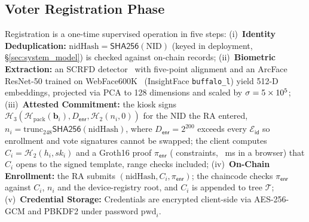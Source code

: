 \documentclass[10pt,letterpaper,journal]{IEEEtran}
\begin{document}
\subsection{Voter Registration Phase}
Registration is a one-time supervised operation in five steps:
(i)~\textbf{Identity Deduplication:} $\text{nidHash} = \mathsf{SHA256}(\text{NID})$ (keyed in deployment, \S\ref{sec:system_model}) is checked against on-chain records;
(ii)~\textbf{Biometric Extraction:} an SCRFD detector~\cite{Guo2022SCRFD} with five-point alignment and an ArcFace ResNet-50 trained on WebFace600K~\cite{Zhu2021WebFace260M} (InsightFace \texttt{buffalo\_l}) yield 512-D embeddings, projected via PCA to 128 dimensions and scaled by $\sigma = 5 \times 10^{5}$;
(iii)~\textbf{Attested Commitment:} the kiosk signs $\mathcal{H}_3(\mathcal{H}_{\text{pack}}(\mathbf{b}_i), D_{\mathsf{enr}}, \mathcal{H}_2(n_i, 0))$ for the NID the RA entered, $n_i = \mathrm{trunc}_{248}\mathsf{SHA256}(\text{nidHash})$, where $D_{\mathsf{enr}} = 2^{200}$ exceeds every $\mathcal{E}_{\mathsf{id}}$ so enrollment and vote signatures cannot be swapped; the client computes $C_i = \mathcal{H}_2(h_i, sk_i)$ and a Groth16 proof $\pi_{\mathsf{enr}}$ (\nEnrollConstraints{} constraints, \nBrowserEnrollMs~ms in a browser) that $C_i$ opens to the signed template, range checks included;
(iv)~\textbf{On-Chain Enrollment:} the RA submits $(\text{nidHash}, C_i, \pi_{\mathsf{enr}})$; the chaincode checks $\pi_{\mathsf{enr}}$ against $C_i$, $n_i$ and the device-registry root, and $C_i$ is appended to tree $\mathcal{T}$;
(v)~\textbf{Credential Storage:} Credentials are encrypted client-side via AES-256-GCM and PBKDF2 under password $\text{pwd}_i$.
\end{document}
